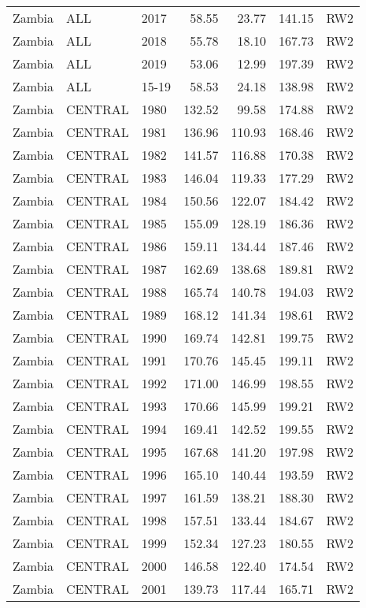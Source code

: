 \begin{longtable}{lllrrrl}
  Zambia & ALL & 2017 & 58.55 & 23.77 & 141.15 & RW2 \\ 
  Zambia & ALL & 2018 & 55.78 & 18.10 & 167.73 & RW2 \\ 
  Zambia & ALL & 2019 & 53.06 & 12.99 & 197.39 & RW2 \\ 
  Zambia & ALL & 15-19 & 58.53 & 24.18 & 138.98 & RW2 \\ 
  Zambia & CENTRAL & 1980 & 132.52 & 99.58 & 174.88 & RW2 \\ 
  Zambia & CENTRAL & 1981 & 136.96 & 110.93 & 168.46 & RW2 \\ 
  Zambia & CENTRAL & 1982 & 141.57 & 116.88 & 170.38 & RW2 \\ 
  Zambia & CENTRAL & 1983 & 146.04 & 119.33 & 177.29 & RW2 \\ 
  Zambia & CENTRAL & 1984 & 150.56 & 122.07 & 184.42 & RW2 \\ 
  Zambia & CENTRAL & 1985 & 155.09 & 128.19 & 186.36 & RW2 \\ 
  Zambia & CENTRAL & 1986 & 159.11 & 134.44 & 187.46 & RW2 \\ 
  Zambia & CENTRAL & 1987 & 162.69 & 138.68 & 189.81 & RW2 \\ 
  Zambia & CENTRAL & 1988 & 165.74 & 140.78 & 194.03 & RW2 \\ 
  Zambia & CENTRAL & 1989 & 168.12 & 141.34 & 198.61 & RW2 \\ 
  Zambia & CENTRAL & 1990 & 169.74 & 142.81 & 199.75 & RW2 \\ 
  Zambia & CENTRAL & 1991 & 170.76 & 145.45 & 199.11 & RW2 \\ 
  Zambia & CENTRAL & 1992 & 171.00 & 146.99 & 198.55 & RW2 \\ 
  Zambia & CENTRAL & 1993 & 170.66 & 145.99 & 199.21 & RW2 \\ 
  Zambia & CENTRAL & 1994 & 169.41 & 142.52 & 199.55 & RW2 \\ 
  Zambia & CENTRAL & 1995 & 167.68 & 141.20 & 197.98 & RW2 \\ 
  Zambia & CENTRAL & 1996 & 165.10 & 140.44 & 193.59 & RW2 \\ 
  Zambia & CENTRAL & 1997 & 161.59 & 138.21 & 188.30 & RW2 \\ 
  Zambia & CENTRAL & 1998 & 157.51 & 133.44 & 184.67 & RW2 \\ 
  Zambia & CENTRAL & 1999 & 152.34 & 127.23 & 180.55 & RW2 \\ 
  Zambia & CENTRAL & 2000 & 146.58 & 122.40 & 174.54 & RW2 \\ 
  Zambia & CENTRAL & 2001 & 139.73 & 117.44 & 165.71 & RW2 \\ 

\end{longtable}
